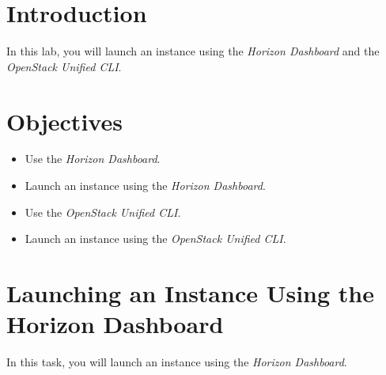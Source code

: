 \documentclass[letterpaper, 12pt]{article}
\begin{document}

\section*{Introduction}
\label{sec:introduction}
In this lab, you will launch an instance using the \textit{Horizon Dashboard} and the \textit{OpenStack Unified CLI}.

\section*{Objectives}
\label{sec:objectives}
\begin{itemize}[itemsep=0pt]
    \item Use the \textit{Horizon Dashboard}.
    \item Launch an instance using the \textit{Horizon Dashboard}.
    \item Use the \textit{OpenStack Unified CLI}.
    \item Launch an instance using the \textit{OpenStack Unified CLI}.
\end{itemize}
\clearpage

\labsettings

\section{Launching an Instance Using the Horizon Dashboard}
In this task, you will launch an instance using the \textit{Horizon Dashboard}.
\end{document}
